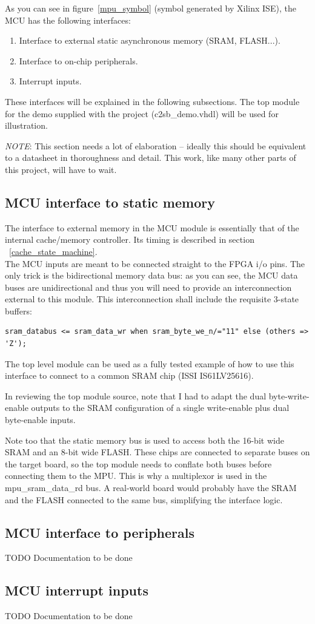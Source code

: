 As you can see in figure~\ref{mpu_symbol} (symbol generated by Xilinx ISE), 
the MCU has the following interfaces:

\begin{enumerate}
    \item Interface to external static asynchronous memory (SRAM, FLASH...).
    \item Interface to on-chip peripherals.
    \item Interrupt inputs.
\end{enumerate}

These interfaces will be explained in the following subsections. The top module
for the demo supplied with the project (c2sb\_demo.vhdl) will be used for 
illustration.

\emph{NOTE}: This section needs a lot of elaboration -- ideally this should be 
equivalent to 
a datasheet in thoroughness and detail. This work, like many other parts of this
project, will have to wait.

\subsection{MCU interface to static memory}
\label{mcu_if_sram}

The interface to external memory in the MCU module is essentially that of the 
internal cache/memory controller. Its timing is described in section 
~\ref{cache_state_machine}.\\

The MCU inputs are meant to be connected straight to the FPGA i/o pins. The only
trick is the bidirectional memory data bus: as you can see, the MCU data buses 
are unidirectional and thus you will need to provide an interconnection
external to this module. This interconnection shall include the requisite 
3-state buffers:

\begin{verbatim}
sram_databus <= sram_data_wr when sram_byte_we_n/="11" else (others => 'Z');
\end{verbatim}

The top level module can be used as a fully tested example of how to use this 
interface to connect to a common SRAM chip (ISSI IS61LV25616).

In reviewing the top module source, note that I had to adapt the dual 
byte-write-enable outputs to the SRAM
configuration of a single write-enable plus dual byte-enable inputs.

Note too that the static memory bus is used to access both the 16-bit wide SRAM 
and an 8-bit wide FLASH. These chips are connected to separate buses on the 
target board, so the top module needs to conflate both buses before connecting 
them to the MPU. This is why a multiplexor is used in the mpu\_sram\_data\_rd
bus. A real-world board would probably have the SRAM and the FLASH connected 
to the same bus, simplifying the interface logic.
   
    
\subsection{MCU interface to peripherals}
\label{mcu_if_io}

    TODO Documentation to be done

\subsection{MCU interrupt inputs}
\label{mcu_irqs}

    TODO Documentation to be done
